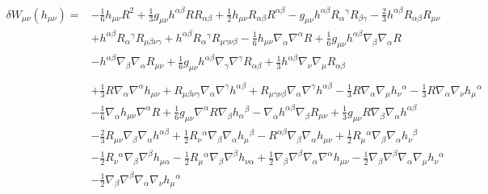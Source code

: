 \documentclass[10pt,letterpaper]{article}
\begin{document}
\begin{align}
\delta W_{\mu\nu}(h_{\mu\nu})={}&- \tfrac{1}{6} h_{\mu \nu} R^2
 + \tfrac{1}{3} g_{\mu \nu} h^{\alpha \beta} R R_{\alpha \beta}
 + \tfrac{1}{2} h_{\mu \nu} R_{\alpha \beta} R^{\alpha \beta}
 -  g_{\mu \nu} h^{\alpha \beta} R_{\alpha}{}^{\gamma} R_{\beta \gamma}
 -  \tfrac{2}{3} h^{\alpha \beta} R_{\alpha \beta} R_{\mu \nu}\nonumber\\
& + h^{\alpha \beta} R_{\alpha}{}^{\gamma} R_{\mu \beta \nu \gamma}
 + h^{\alpha \beta} R_{\alpha}{}^{\gamma} R_{\mu \gamma \nu \beta}
 -  \tfrac{1}{6} h_{\mu \nu} \nabla_{\alpha}\nabla^{\alpha}R
 + \tfrac{1}{6} g_{\mu \nu} h^{\alpha \beta} \nabla_{\beta}\nabla_{\alpha}R\nonumber\\
& -  h^{\alpha \beta} \nabla_{\beta}\nabla_{\alpha}R_{\mu \nu}
 + \tfrac{1}{6} g_{\mu \nu} h^{\alpha \beta} \nabla_{\gamma}\nabla^{\gamma}R_{\alpha \beta}
 + \tfrac{1}{3} h^{\alpha \beta} \nabla_{\nu}\nabla_{\mu}R_{\alpha \beta}\nonumber \\ \nonumber
\\
&+\tfrac{1}{3} R \nabla_{\alpha}\nabla^{\alpha}h_{\mu \nu}
 + R_{\mu \beta \nu \gamma} \nabla_{\alpha}\nabla^{\gamma}h^{\alpha \beta}
 + R_{\mu \gamma \nu \beta} \nabla_{\alpha}\nabla^{\gamma}h^{\alpha \beta}
 -  \tfrac{1}{3} R \nabla_{\alpha}\nabla_{\mu}h_{\nu}{}^{\alpha}
 -  \tfrac{1}{3} R \nabla_{\alpha}\nabla_{\nu}h_{\mu}{}^{\alpha}\nonumber\\
& -  \tfrac{1}{6} \nabla_{\alpha}h_{\mu \nu} \nabla^{\alpha}R
 + \tfrac{1}{6} g_{\mu \nu} \nabla^{\alpha}R \nabla_{\beta}h_{\alpha}{}^{\beta}
 -  \nabla_{\alpha}h^{\alpha \beta} \nabla_{\beta}R_{\mu \nu}
 + \tfrac{1}{3} g_{\mu \nu} R \nabla_{\beta}\nabla_{\alpha}h^{\alpha \beta}\nonumber\\
& -  \tfrac{2}{3} R_{\mu \nu} \nabla_{\beta}\nabla_{\alpha}h^{\alpha \beta}
 + \tfrac{1}{2} R_{\nu}{}^{\alpha} \nabla_{\beta}\nabla_{\alpha}h_{\mu}{}^{\beta}
 -  R^{\alpha \beta} \nabla_{\beta}\nabla_{\alpha}h_{\mu \nu}
 + \tfrac{1}{2} R_{\mu}{}^{\alpha} \nabla_{\beta}\nabla_{\alpha}h_{\nu}{}^{\beta}\nonumber\\
& -  \tfrac{1}{2} R_{\nu}{}^{\alpha} \nabla_{\beta}\nabla^{\beta}h_{\mu \alpha}
 -  \tfrac{1}{2} R_{\mu}{}^{\alpha} \nabla_{\beta}\nabla^{\beta}h_{\nu \alpha}
 + \tfrac{1}{2} \nabla_{\beta}\nabla^{\beta}\nabla_{\alpha}\nabla^{\alpha}h_{\mu \nu}
 -  \tfrac{1}{2} \nabla_{\beta}\nabla^{\beta}\nabla_{\alpha}\nabla_{\mu}h_{\nu}{}^{\alpha}\nonumber\\
& -  \tfrac{1}{2} \nabla_{\beta}\nabla^{\beta}\nabla_{\alpha}\nabla_{\nu}h_{\mu}{}^{\alpha}

\end{align}
\end{document}
